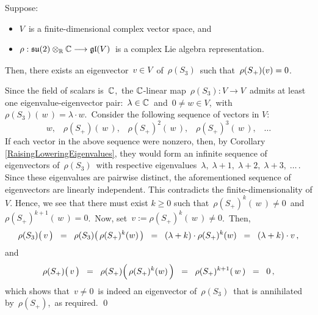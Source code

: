\vskip 0.5cm
\begin{corollary}
\label{EigenvectorOfS3KilledBySplus}
\mbox{}
\vskip 0.1cm
\noindent
Suppose:
\begin{itemize}
\item
	$V$\, is a {\color{red}finite-dimensional} complex vector space, and
\item
	$\rho : \mathfrak{su}(2) \otimes_{\mathbb{R}} \mathbb{C} \longrightarrow \mathfrak{gl}(V)$\,
	is a complex Lie algebra representation.
\end{itemize}
Then, there exists an eigenvector \,$v \in V$\, of \,$\rho(S_{3})$\, such that
\,$\rho(\overset{{\color{white}.}}{S}_{+})(v) = 0$.\,
\end{corollary}
\proof
{\color{blue}Since the field of scalars is \,$\mathbb{C}$},\, the $\mathbb{C}$-linear map
\,$\rho(S_{3}) : V \longrightarrow V$\,
admits at least one eigenvalue-eigenvector pair: \,$\lambda \in \mathbb{C}$\, and \,$0 \neq w \in V$,\,
with \,$\rho(S_{3})(\,w\,) = \lambda \cdot w$.\,
Consider the following sequence of vectors in $V$:
\begin{equation*}
w,\;\;\; \rho(S_{+})(\,w\,),\;\;\; \rho(S_{+})^{2}(\,w\,),\;\;\; \rho(S_{+})^{3}(\,w\,),\;\;\; \ldots
\end{equation*}
If each vector in the above sequence were nonzero, then,
by Corollary \ref{RaisingLoweringEigenvalues}, they would form an infinite sequence of eigenvectors of
\,$\rho(S_{3})$\, with respective eigenvalues \,$\lambda,\;\lambda+1,\;\lambda+2,\;\lambda+3,\;\ldots$\,.
Since these eigenvalues are pairwise distinct, the aforementioned sequence of eigenvectors are linearly independent.
This contradicts the {\color{red}finite-dimensionality} of $V$.
Hence, we see that there must exist $k \geq 0$ such that
\,$\rho(S_{+})^{k}(\,w\,) \neq 0$\, and \,$\rho(S_{+})^{k+1}(\,w\,) = 0$.\,
Now, set \,$v := \rho(S_{+})^{k}(\,w\,) \neq 0$.\,
Then,
\begin{equation*}
\rho(S_{3})\!\left(\,\overset{{\color{white}.}}{v}\,\right)
\;\; = \;\;
	\rho(S_{3})\!\left(\,\rho(S_{+})^{k}(\overset{{\color{white}.}}{w})\,\right)
\;\; = \;\;
	(\lambda + k) \cdot \rho(S_{+})^{k}(\overset{{\color{white}.}}{w})
\;\; = \;\;
	(\lambda + k) \cdot v\,,
\end{equation*}
and
\begin{equation*}
\rho(S_{+})\!\left(\,\overset{{\color{white}.}}{v}\,\right)
\;\; = \;\;
	\rho(S_{+})\!\left(\,\overset{{\color{white}1}}{\rho}(S_{+})^{k}(w)\,\right)
\;\; = \;\;
	\rho(S_{+})^{k+1}(\,w\,)
\;\; = \;\;
	0\,,
\end{equation*}
which shows that \,$v \neq 0$\, is indeed an eigenvector of \,$\rho(S_{3})$\, that is annihilated by
\,$\rho(S_{+})$,\, as required.
\qed

